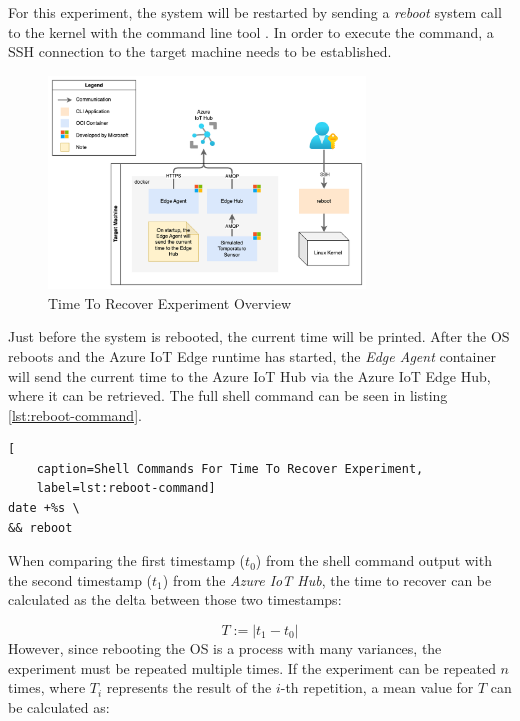For this experiment, the system will be restarted by sending a \textit{reboot} system
call to the kernel with the  command line tool \cite{man-reboot}.
In order to execute the command, a \ac{SSH} connection to the target machine
needs to be established.

\clearpage

\begin{figure}[H]
    \centering
    \includegraphics[width=0.75\textwidth]{fig/reboot-setup.drawio.png}
    \caption{Time To Recover Experiment Overview}
\end{figure}

\noindent
Just before the system is rebooted, the current time will be printed.
After the \ac{OS} reboots and the Azure IoT Edge runtime has started, the
\textit{Edge Agent} container will send the current time to the Azure IoT Hub via
the Azure IoT Edge Hub, where it can be retrieved. The full shell command can
be seen in listing \ref{lst:reboot-command}.
\\

\begin{lstlisting}[
    caption=Shell Commands For Time To Recover Experiment,
    label=lst:reboot-command]
date +%s \
&& reboot
\end{lstlisting}

\noindent
When comparing the first timestamp ($t_0$) from the shell command output with the second
timestamp ($t_1$) from the \textit{Azure IoT Hub}, the time to recover can be calculated
as the delta between those two timestamps:

\begin{equation}
    T := |t_1 - t_0|
\end{equation}
However, since rebooting the \ac{OS} is a process with many variances, the experiment
must be repeated multiple times. If the experiment can be repeated $n$ times, where
$T_i$ represents the result of the $i$-th repetition, a mean value for $T$ can be
calculated as:

